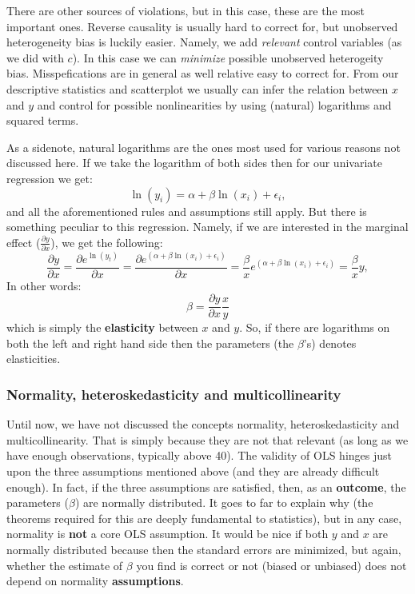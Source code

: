 \documentclass[]{article}
\begin{document}
There are other sources of violations, but in this case, these are the
most important ones. Reverse causality is usually hard to correct for,
but unobserved heterogeneity bias is luckily easier. Namely, we add
\emph{relevant} control variables (as we did with \(c\)). In this case
we can \emph{minimize} possible unobserved heterogeity bias.
Misspefications are in general as well relative easy to correct for.
From our descriptive statistics and scatterplot we usually can infer the
relation between \(x\) and \(y\) and control for possible nonlinearities
by using (natural) logarithms and squared terms.

As a sidenote, natural logarithms are the ones most used for various
reasons not discussed here. If we take the logarithm of both sides then
for our univariate regression we get: \[
\ln(y_i) = \alpha + \beta \ln(x_i) + \epsilon_i,
\] and all the aforementioned rules and assumptions still apply. But
there is something peculiar to this regression. Namely, if we are
interested in the marginal effect (\(\frac{\partial y}{\partial x}\)),
we get the following: \[
\frac{\partial y}{\partial x} = \frac{\partial e^{\ln(y_t)}}{\partial x} = \frac{\partial e^{(\alpha + \beta \ln(x_i) + \epsilon_i)}}{\partial x} = \frac{\beta}{x}e^{(\alpha + \beta \ln(x_i) + \epsilon_i)} = \frac{\beta}{x}y, 
\] In other words: \[
\beta = \frac{\partial y}{\partial x} \frac{x}{y}
\] which is simply the \textbf{elasticity} between \(x\) and \(y\). So,
if there are logarithms on both the left and right hand side then the
parameters (the \(\beta\)'s) denotes elasticities.

\subsubsection{Normality, heteroskedasticity and
multicollinearity}\label{normality-heteroskedasticity-and-multicollinearity}

Until now, we have not discussed the concepts normality,
heteroskedasticity and multicollinearity. That is simply because they
are not that relevant (as long as we have enough observations, typically
above 40). The validity of OLS hinges just upon the three assumptions
mentioned above (and they are already difficult enough). In fact, if the
three assumptions are satisfied, then, as an \textbf{outcome}, the
parameters (\(\beta\)) are normally distributed. It goes to far to
explain why (the theorems required for this are deeply fundamental to
statistics), but in any case, normality is \textbf{not} a core OLS
assumption. It would be nice if both \(y\) and \(x\) are normally
distributed because then the standard errors are minimized, but again,
whether the estimate of \(\beta\) you find is correct or not (biased or
unbiased) does not depend on normality \textbf{assumptions}.
\end{document}
